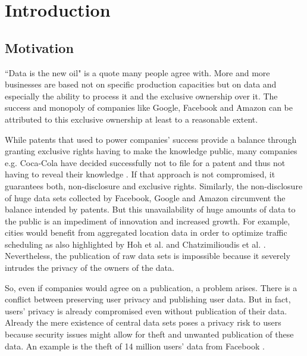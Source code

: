 
\chapter{Introduction}\label{chapter:introduction}
\section{Motivation}

“Data is the new oil" \parencite{data-is-the-new-oil, data-is-the-new-oil2} is a quote many people agree with. More and more businesses are based not on specific production capacities but on data and especially the ability to process it and the exclusive ownership over it. The success and monopoly of companies like Google, Facebook and Amazon can be attributed to this exclusive ownership at least to a reasonable extent.

While patents that used to power companies' success provide a balance through granting exclusive rights having to make the knowledge public, many companies e.g. Coca-Cola have decided successfully not to file for a patent and thus not having to reveal their knowledge \parencite{coca-cola}. If that approach is not compromised, it guarantees both, non-disclosure and  exclusive rights. Similarly, the non-disclosure of huge data sets collected by Facebook, Google and Amazon circumvent the balance intended by patents. But this unavailability of huge amounts of data to the public is an impediment of innovation and increased growth. For example, cities would benefit from aggregated location data in order to optimize traffic scheduling as also highlighted by Hoh et al. \parencite{hoh2005protecting} and Chatzimilioudis et al. \parencite{chatzimilioudis2012crowdsourcing}.
Nevertheless, the publication of raw data sets is impossible because it severely intrudes the privacy of the owners of the data.

So, even if companies would agree on a publication, a problem arises.
There is a conflict between preserving user privacy and publishing user data.
But in fact, users' privacy is already compromised even without publication of their data. Already the mere existence of central data sets poses a privacy risk to users because security issues might allow for theft and unwanted publication of these data.
An example is the theft of 14 million users' data from Facebook \parencite{facebook}.

